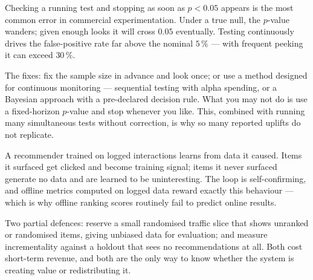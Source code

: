 \begin{cautionbox}
Checking a running test and stopping as soon as $p < 0.05$ appears is the most
common error in commercial experimentation. Under a true null, the $p$-value
wanders; given enough looks it will cross $0.05$ eventually. Testing
continuously drives the false-positive rate far above the nominal $5\,\%$ ---
with frequent peeking it can exceed $30\,\%$.

The fixes: fix the sample size in advance and look once; or use a method
designed for continuous monitoring --- sequential testing with alpha spending, or
a Bayesian approach with a pre-declared decision rule. What you may not do is
use a fixed-horizon $p$-value and stop whenever you like. This, combined with
running many simultaneous tests without correction, is why so many reported
uplifts do not replicate.
\end{cautionbox}

\begin{cautionbox}
A recommender trained on logged interactions learns from data it caused. Items
it surfaced get clicked and become training signal; items it never surfaced
generate no data and are learned to be uninteresting. The loop is
self-confirming, and offline metrics computed on logged data reward exactly
this behaviour --- which is why offline ranking scores routinely fail to predict
online results.

Two partial defences: reserve a small randomised traffic slice that shows
unranked or randomised items, giving unbiased data for evaluation; and measure
incrementality against a holdout that sees no recommendations at all. Both cost
short-term revenue, and both are the only way to know whether the system is
creating value or redistributing it.
\end{cautionbox}

